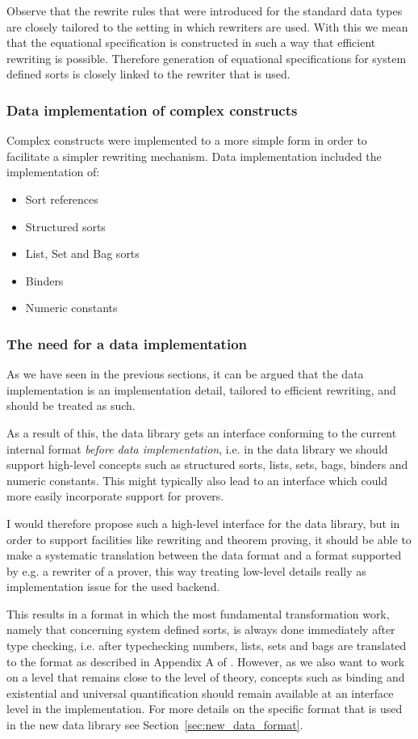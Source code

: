 \documentclass[a4paper,11pt]{article}
\begin{document}
Observe that the rewrite rules that were introduced for the standard data types are closely tailored to the setting in which rewriters are used. With this we mean that the equational specification is constructed in such a way that efficient rewriting is possible. Therefore generation of equational specifications for system defined sorts is closely linked to the rewriter that is used.

\subsubsection{Data implementation of complex constructs}
Complex constructs were implemented to a more simple form in order to facilitate a simpler rewriting mechanism. Data implementation included the implementation of:
\begin{itemize}
 \item Sort references
 \item Structured sorts
 \item List, Set and Bag sorts
 \item Binders
 \item Numeric constants
\end{itemize}

\subsubsection{The need for a data implementation}
As we have seen in the previous sections, it can be argued that the data implementation is an implementation detail, tailored to efficient rewriting, and should be treated as such.

As a result of this, the data library gets an interface conforming to the current internal format \emph{before data implementation}, i.e. in the data library we should support high-level concepts such as structured sorts, lists, sets, bags, binders and numeric constants. This might typically also lead to an interface which could more easily incorporate support for provers.

I would therefore propose such a high-level interface for the data library, but in order to support facilities like rewriting and theorem proving, it should be able to make a systematic translation between the data format and a format supported by e.g. a rewriter of a prover, this way treating low-level details really as implementation issue for the used backend.

This results in a format in which the most fundamental transformation work, namely that concerning system defined sorts, is always done immediately after type checking, i.e. after typechecking numbers, lists, sets and bags are translated to the format as described in Appendix A of \cite{groote07dubs}. However, as we also want to work on a level that remains close to the level of theory, concepts such as binding and existential and universal quantification should remain available at an interface level in the implementation. For more details on the specific format that is used in the new data library see Section~\ref{sec:new_data_format}.
\end{document}

